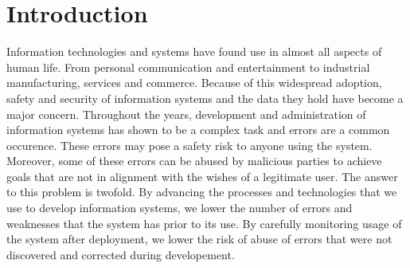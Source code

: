 

\chapter{Introduction}
Information technologies and systems have found use in almost all aspects of human life. From personal communication and entertainment to industrial manufacturing, services and commerce. Because of this widespread adoption, safety and security of information systems and the data they hold have become a major concern. Throughout the years, development and administration of information systems has shown to be a complex task and errors are a common occurence. These errors may pose a safety risk to anyone using the system. Moreover, some of these errors can be abused by malicious parties to achieve goals that are not in alignment with the wishes of a legitimate user. The answer to this problem is twofold. By advancing the processes and technologies that we use to develop information systems, we lower the number of errors and weaknesses that the system has prior to its use. By carefully monitoring usage of the system after deployment, we lower the risk of abuse of errors that were not discovered and corrected during developement.

